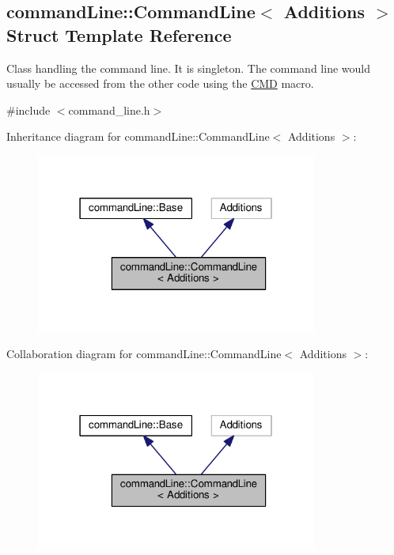 \hypertarget{structcommandLine_1_1CommandLine}{}\subsection{command\+Line\+:\+:Command\+Line$<$ Additions $>$ Struct Template Reference}
\label{structcommandLine_1_1CommandLine}


Class handling the command line. It is singleton. The command line would usually be accessed from the other code using the \hyperlink{command__line_8h_a0a5ceb9ceb914e08d345410b561cb37a}{C\+MD} macro.  




{\ttfamily \#include $<$command\+\_\+line.\+h$>$}



Inheritance diagram for command\+Line\+:\+:Command\+Line$<$ Additions $>$\+:\nopagebreak
\begin{figure}[H]
\begin{center}
\leavevmode
\includegraphics[width=262pt]{structcommandLine_1_1CommandLine__inherit__graph}
\end{center}
\end{figure}


Collaboration diagram for command\+Line\+:\+:Command\+Line$<$ Additions $>$\+:\nopagebreak
\begin{figure}[H]
\begin{center}
\leavevmode
\includegraphics[width=262pt]{structcommandLine_1_1CommandLine__coll__graph}
\end{center}
\end{figure}
